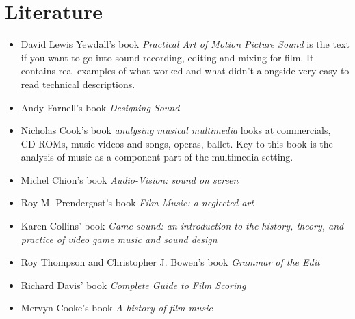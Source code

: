 
\chapter{Literature}
\label{literatures}

\begin{itemize}
\item David Lewis Yewdall's book \textit{Practical Art of Motion Picture Sound} \citep{yewdall2003practical} 
is the text if you want to go into sound recording, editing and mixing for film. It contains real examples of what worked and what didn't alongside very easy to read technical descriptions. 


\item Andy Farnell's book \textit{Designing Sound} \citep{farnell2010designing}

 
\item Nicholas Cook's book \textit{analysing musical multimedia} \citep{cook1998analysing} looks at commercials, CD-ROMs, music videos and songs, operas, ballet. Key to this book is the analysis of music as a component part of the multimedia setting. 


\item Michel Chion's book \textit{Audio-Vision: sound on screen} \citep{chion1990} 


\item Roy M. Prendergast's book \textit{Film Music: a neglected art} \citep{prendergast1992film} 

\item Karen Collins' book \textit{Game sound: an introduction to the history, theory, and practice of video game music and sound design} \citep{collins2008game}


\item Roy Thompson and Christopher J. Bowen's book \textit{Grammar of the Edit} \citep{thompson2009grammar} 

\item Richard Davis' book \textit{Complete Guide to Film Scoring} \citep{davis2010complete}

\item Mervyn Cooke's book \textit{A history of film music} \citep{cooke2008history}

\end{itemize}
